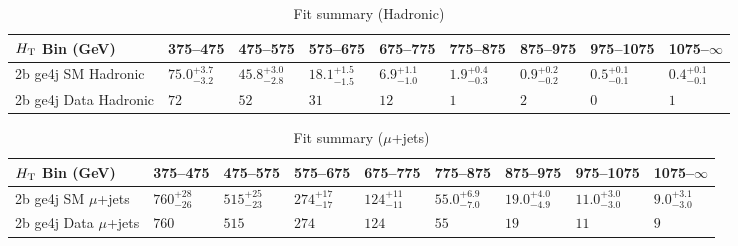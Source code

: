 \documentclass[8pt]{article}
\def\scalht{\mbox{$H_{\rm{T}}$}\xspace}
\newcommand\T{\rule{0pt}{2.6ex}}
\begin{document}
\begin{table}[ht!]
\caption{Fit summary (Hadronic)}
\label{tab:ensemble-summary}
\centering
\begin{tabular}{ lllllllll }

\hline
\scalht Bin (GeV)       & 375--475                       & 475--575                       & 575--675                       & 675--775                       & 775--875                       & 875--975                       & 975--1075                      & 1075--$\infty$                 \\ [1.000000ex]
\hline
2b ge4j SM Hadronic\T   & $75.0^{+3.7}_{-3.2}$           & $45.8^{+3.0}_{-2.8}$           & $18.1^{+1.5}_{-1.5}$           & $6.9^{+1.1}_{-1.0}$            & $1.9^{+0.4}_{-0.3}$            & $0.9^{+0.2}_{-0.2}$            & $0.5^{+0.1}_{-0.1}$            & $0.4^{+0.1}_{-0.1}$            \\ 
2b ge4j Data Hadronic\T & $72$                           & $52$                           & $31$                           & $12$                           & $1$                            & $2$                            & $0$                            & $1$                            \\ 
\hline

\end{tabular}
\end{table}
\begin{table}[ht!]
\caption{Fit summary ($\mu$+jets)}
\label{tab:ensemble-summary}
\centering
\begin{tabular}{ lllllllll }

\hline
\scalht Bin (GeV)       & 375--475                       & 475--575                       & 575--675                       & 675--775                       & 775--875                       & 875--975                       & 975--1075                      & 1075--$\infty$                 \\ [1.000000ex]
\hline
2b ge4j SM $\mu$+jets\T & $760^{+28}_{-26}$              & $515^{+25}_{-23}$              & $274^{+17}_{-17}$              & $124^{+11}_{-11}$              & $55.0^{+6.9}_{-7.0}$           & $19.0^{+4.0}_{-4.9}$           & $11.0^{+3.0}_{-3.0}$           & $9.0^{+3.1}_{-3.0}$            \\ 
2b ge4j Data $\mu$+jets\T & $760$                          & $515$                          & $274$                          & $124$                          & $55$                           & $19$                           & $11$                           & $9$                            \\ 
\hline

\end{tabular}
\end{table}
\end{document}
